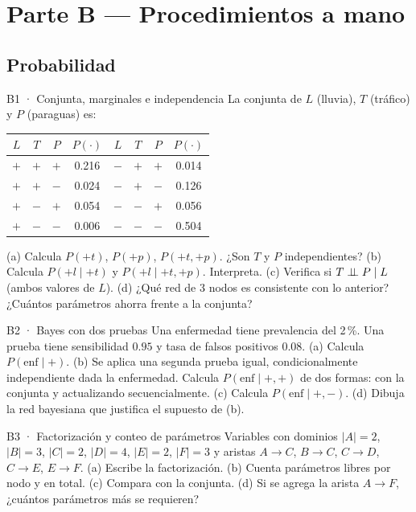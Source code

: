 \section{Parte B — Procedimientos a mano }

\subsection{Probabilidad}

\begin{ejercicio}{B1 · Conjunta, marginales e independencia }
La conjunta de $L$ (lluvia), $T$ (tráfico) y $P$ (paraguas) es:
\begin{center}\small
\begin{tabular}{ccc|c@{\qquad}ccc|c}
$L$ & $T$ & $P$ & $P(\cdot)$ & $L$ & $T$ & $P$ & $P(\cdot)$\\\hline
$+$ & $+$ & $+$ & 0.216 & $-$ & $+$ & $+$ & 0.014\\
$+$ & $+$ & $-$ & 0.024 & $-$ & $+$ & $-$ & 0.126\\
$+$ & $-$ & $+$ & 0.054 & $-$ & $-$ & $+$ & 0.056\\
$+$ & $-$ & $-$ & 0.006 & $-$ & $-$ & $-$ & 0.504
\end{tabular}
\end{center}
(a) Calcula $P(+t)$, $P(+p)$, $P(+t,+p)$. ¿Son $T$ y $P$ independientes?
(b) Calcula $P(+l\mid+t)$ y $P(+l\mid+t,+p)$. Interpreta.
(c) Verifica si $T\perp\!\!\!\perp P\mid L$ (ambos valores de $L$).
(d) ¿Qué red de 3 nodos es consistente con lo anterior? ¿Cuántos parámetros ahorra frente a la conjunta?
\end{ejercicio}

\begin{ejercicio}{B2 · Bayes con dos pruebas }
Una enfermedad tiene prevalencia del 2\,\%. Una prueba tiene sensibilidad $0.95$ y tasa de falsos positivos $0.08$.
(a) Calcula $P(\text{enf}\mid+)$.
(b) Se aplica una segunda prueba igual, condicionalmente independiente dada la enfermedad. Calcula
$P(\text{enf}\mid+,+)$ de dos formas: con la conjunta y actualizando secuencialmente.
(c) Calcula $P(\text{enf}\mid+,-)$.
(d) Dibuja la red bayesiana que justifica el supuesto de (b).
\end{ejercicio}

\begin{ejercicio}{B3 · Factorización y conteo de parámetros }
Variables con dominios $|A|=2$, $|B|=3$, $|C|=2$, $|D|=4$, $|E|=2$, $|F|=3$ y aristas $A\to C$, $B\to C$, $C\to D$, $C\to E$, $E\to F$.
(a) Escribe la factorización. (b) Cuenta parámetros libres por nodo y en total. (c) Compara con la conjunta.
(d) Si se agrega la arista $A\to F$, ¿cuántos parámetros más se requieren?
\end{ejercicio}

